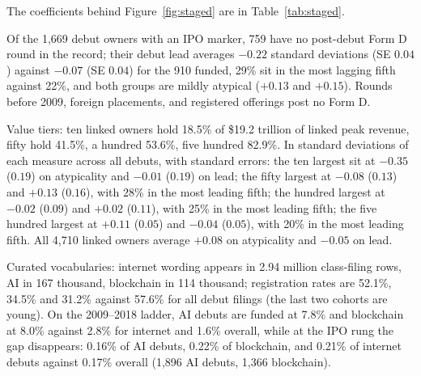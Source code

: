 The coefficients behind Figure~\ref{fig:staged} are in Table~\ref{tab:staged}.



Of the 1{,}669 debut owners with an IPO marker, 759 have no post-debut
Form D round in the record; their debut lead averages $-0.22$ standard
deviations (SE $0.04$) against $-0.07$ (SE $0.04$) for the 910 funded,
29\% sit in the most lagging fifth against 22\%, and both groups are
mildly atypical ($+0.13$ and $+0.15$). Rounds before 2009, foreign
placements, and registered offerings post no Form D.

Value tiers: ten linked owners hold 18.5\% of \$19.2 trillion of linked
peak revenue, fifty hold 41.5\%, a hundred 53.6\%, five hundred 82.9\%.
In standard deviations of each measure across all debuts, with standard
errors: the ten largest sit at $-0.35$ ($0.19$) on atypicality and
$-0.01$ ($0.19$) on lead; the fifty largest at $-0.08$ ($0.13$) and
$+0.13$ ($0.16$), with 28\% in the most leading fifth; the hundred
largest at $-0.02$ ($0.09$) and $+0.02$ ($0.11$), with 25\% in the most
leading fifth; the five hundred largest at $+0.11$ ($0.05$) and $-0.04$
($0.05$), with 20\% in the most leading fifth. All 4{,}710 linked owners
average $+0.08$ on atypicality and $-0.05$ on lead.

Curated vocabularies: internet wording appears in 2.94 million
class-filing rows, AI in 167 thousand, blockchain in 114 thousand;
registration rates are 52.1\%, 34.5\% and 31.2\% against 57.6\% for all
debut filings (the last two cohorts are young). On the 2009--2018 ladder,
AI debuts are funded at 7.8\% and blockchain at 8.0\% against 2.8\% for
internet and 1.6\% overall, while at the IPO rung the gap disappears:
0.16\% of AI debuts, 0.22\% of blockchain, and 0.21\% of internet debuts
against 0.17\% overall (1{,}896 AI debuts, 1{,}366 blockchain).
